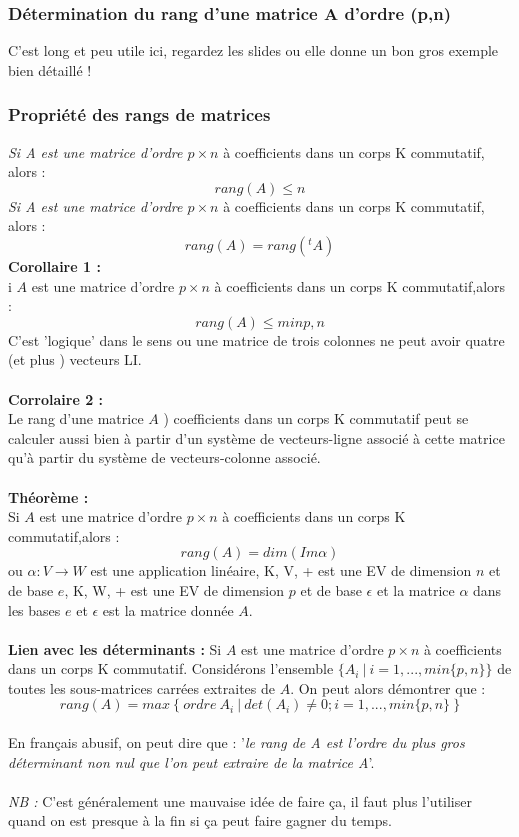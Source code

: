 \documentclass[12pt, a4paper]{article}
\begin{document}
\subsubsection{Détermination du rang d'une matrice A d'ordre (p,n)}
C'est long et peu utile ici, regardez les slides ou elle donne un bon gros exemple bien détaillé !

\subsubsection{Propriété des rangs de matrices}
\textit{Si A est une matrice d'ordre $p \times n$} à coefficients dans un corps K commutatif, alors  :
$$rang(A) \leq n$$
\textit{Si A est une matrice d'ordre $p \times n$} à coefficients dans un corps K commutatif, alors :
$$rang(A) = rang( ^t A)$$
\textbf{Corollaire 1 :}\\
i $A$ est une matrice d'ordre $p \times n$  à coefficients dans un corps K commutatif,alors :
$$rang(A) \leq min{p,n}$$
C'est 'logique' dans le sens ou une matrice de trois colonnes ne peut avoir quatre (et plus ) vecteurs LI.\\
\\
\textbf{Corrolaire 2 :}\\
Le rang d'une matrice $A$ ) coefficients dans un corps K commutatif peut se calculer aussi bien à partir d'un système de vecteurs-ligne associé à cette matrice qu'à partir du système de vecteurs-colonne associé.\\
\\
\textbf{Théorème :}\\
Si $A$ est une matrice d'ordre $p \times n$  à coefficients dans un corps K commutatif,alors :
$$rang(A) = dim(Im \alpha)$$
ou $\alpha : V \rightarrow W$ est une application linéaire, K, V, + est une EV de dimension $n$ et de base $e$, K, W, + est une EV de dimension $p$ et de base $\epsilon$ et la matrice $\alpha$ dans les bases $e$ et $\epsilon$ est la matrice donnée $A$.\\
\\
\textbf{Lien avec les déterminants :}
Si $A$ est une matrice d'ordre $p \times n$  à coefficients dans un corps K commutatif. Considérons l'ensemble $\lbrace A_i\ \vert\ i=1,...,min\{p,n\}\rbrace$ de toutes les sous-matrices carrées extraites de $A$. On peut alors démontrer que :
$$rang(A) = max\ \lbrace\ ordre\ A_i\ \vert\ det(A_i) \neq 0 ; i = 1,...,min\{p,n\}\ \rbrace$$
\\
En français abusif, on peut dire que : '\textit{le rang de A est l'ordre du plus gros déterminant non nul que l'on peut extraire de la matrice A}'.\\\\
\textit{NB :} C'est généralement une mauvaise idée de faire ça, il faut plus l'utiliser quand on est presque à la fin si ça peut faire gagner du temps.
\end{document}
